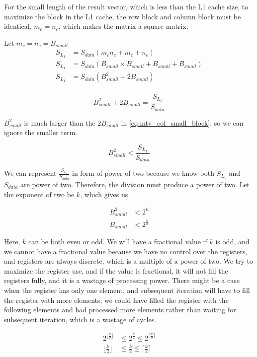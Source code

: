 For the small length of the result vector, which is less than the L1 
cache size, to maximize the block in the L1 cache, the row block and 
column block must be identical, $m_c = n_c$, which makes the matrix a square matrix.

Let $m_c = n_c = B_{small}$
\begin{align*}
    S_{L_1} &= S_{data}(m_cn_c + m_c + n_c)\\
    S_{L_1} &= S_{data}(B_{small} \times B_{small} + B_{small} + B_{small})\\
    S_{L_1} &= S_{data}(B_{small}^2 + 2B_{small})\\
\end{align*}

\begin{equation}
    B_{small}^2 + 2B_{small} = \frac{S_{L_1}}{S_{data}}
    \label{eq:mtv_col_small_block} 
\end{equation}

$B_{small}^2$ is much larger than the $2B_{small}$ in \ref{eq:mtv_col_small_block}, so we can ignore the smaller term.

\[B_{small}^2 < \frac{S_{L_1}}{S_{data}}\]

We can represent $\frac{S_{L_1}}{S_{data}}$ in form of power of two because 
we know both $S_{L_1}$ and $S_{data}$ are power of two. Therefore, the division must 
produce a power of two. Let the exponent of two be $k$, which gives us

\begin{align*}
    B_{small}^2 &< 2^k\\
    B_{small} &< 2^{\frac{k}{2} }
\end{align*}

Here, $k$ can be both even or odd. We will have a fractional value if $k$ is odd, 
and we cannot have a fractional value because we have no control over the registers, 
and registers are always discrete, which is a multiple of a power of two. 
We try to maximize the register use, and if the value is fractional, 
it will not fill the registers fully, and it is a wastage of processing power. 
There might be a case when the register has only one element, and subsequent 
iteration will have to fill the register with more elements; we could have filled 
the register with the following elements and had processed more elements rather 
than waiting for subsequent iteration, which is a wastage of cycles.

\begin{align*}
    2^{\lfloor \frac{k}{2} \rfloor} &\leq 2^{\frac{k}{2}} \leq 2^{\lceil \frac{k}{2} \rceil}\\
    \lfloor \frac{k}{2} \rfloor &\leq \frac{k}{2} \leq \lceil \frac{k}{2} \rceil\\
\end{align*}

